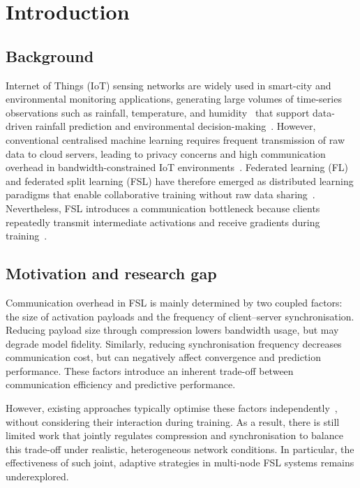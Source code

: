 \documentclass[conference]{IEEEtran}
\begin{document}
\section{Introduction}
\label{sec:intro}

\subsection{Background}

Internet of Things (IoT) sensing networks are widely used in smart-city and environmental monitoring applications, generating large volumes of time-series observations such as rainfall, temperature, and humidity~\cite{GUBBI20131645,6740844} that support data-driven rainfall prediction and environmental decision-making~\cite{CHAN2023100375,10.3389/frwa.2024.1378598}. However, conventional centralised machine learning requires frequent transmission of raw data to cloud servers, leading to privacy concerns and high communication overhead in bandwidth-constrained IoT environments~\cite{pmlr-v54-mcmahan17a,2019arXiv191204977K}. Federated learning (FL) and federated split learning (FSL) have therefore emerged as distributed learning paradigms that enable collaborative training without raw data sharing~\cite{pmlr-v54-mcmahan17a,thapa2022splitfedfederatedlearningmeets,vepakomma2018splitlearninghealthdistributed}. Nevertheless, FSL introduces a communication bottleneck because clients repeatedly transmit intermediate activations and receive gradients during training~\cite{vepakomma2018splitlearninghealthdistributed,thapa2022splitfedfederatedlearningmeets}.


\subsection{Motivation and research gap}

Communication overhead in FSL is mainly determined by two coupled factors: the size of activation payloads and the frequency of client–server synchronisation. Reducing payload size through compression lowers bandwidth usage, but may degrade model fidelity. Similarly, reducing synchronisation frequency decreases communication cost, but can negatively affect convergence and prediction performance. These factors introduce an inherent trade-off between communication efficiency and predictive performance.

However, existing approaches typically optimise these factors independently~\cite{shiranthika2024splitfedziplearnedcompressiondata,11458714}, without considering their interaction during training. As a result, there is still limited work that jointly regulates compression and synchronisation to balance this trade-off under realistic, heterogeneous network conditions. In particular, the effectiveness of such joint, adaptive strategies in multi-node FSL systems remains underexplored.
\end{document}
